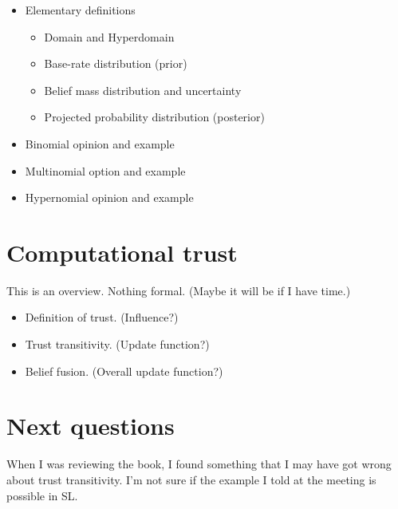 \documentclass[a4paper,12pt]{article}
\theoremstyle{definition}
\numberwithin{equation}{section}
\begin{document}
\begin{itemize}
	\item Elementary definitions
	
	\begin{itemize}
		\item Domain and Hyperdomain
		
		\item Base-rate distribution (prior)
		
		\item Belief mass distribution and uncertainty
		
		\item Projected probability distribution (posterior)
	\end{itemize}
	
	\item Binomial opinion and example
	
	\item Multinomial option and example
	
	\item Hypernomial opinion and example
	
\end{itemize}

\section{Computational trust}

This is an overview. Nothing formal. (Maybe it will be if I have time.)

\begin{itemize}
	\item Definition of trust. (Influence?)
	
	\item Trust transitivity. (Update function?)
	
	\item Belief fusion. (Overall update function?)
\end{itemize}

\section{Next questions}

When I was reviewing the book, I found something that I may have got wrong about trust transitivity. I'm not sure if the example I told at the meeting is possible in SL.
\end{document}
